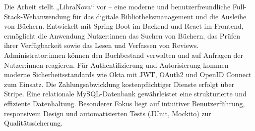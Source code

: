 \kurzfassung

Die Arbeit stellt „LibraNova“ vor – eine moderne und benutzerfreundliche Full-Stack-Webanwendung für das digitale Bibliotheksmanagement und die Ausleihe von Büchern. Entwickelt mit Spring Boot im Backend und React im Frontend, ermöglicht die Anwendung Nutzer:innen das Suchen von Büchern, das Prüfen ihrer Verfügbarkeit sowie das Lesen und Verfassen von Reviews. Administrator:innen können den Buchbestand verwalten und auf Anfragen der Nutzer:innen reagieren. Für Authentifizierung und Autorisierung kommen moderne Sicherheitsstandards wie Okta mit JWT, OAuth2 und OpenID Connect zum Einsatz. Die Zahlungsabwicklung kostenpflichtiger Dienste erfolgt über Stripe. Eine relationale MySQL-Datenbank gewährleistet eine strukturierte und effiziente Datenhaltung. Besonderer Fokus liegt auf intuitiver Benutzerführung, responsivem Design und automatisierten Tests (JUnit, Mockito) zur Qualitätssicherung.



